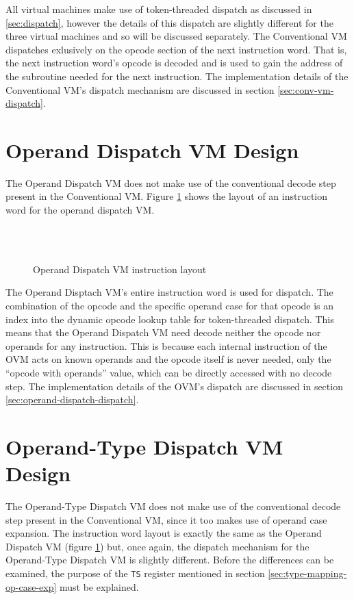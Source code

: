 \documentclass[english,a4paper,12pt]{report}
\begin{document}
All virtual machines make use of token-threaded dispatch as discussed
in \ref{sec:dispatch}, however the details of this dispatch are
slightly different for the three virtual machines and so will be
discussed separately. The Conventional VM dispatches exlusively on the
opcode section of the next instruction word. That is, the next
instruction word's opcode is decoded and is used to gain the address
of the subroutine needed for the next instruction. The implementation
details of the Conventional VM's dispatch mechanism are discussed in
section \ref{sec:conv-vm-dispatch}.


\section{Operand Dispatch VM Design}
The Operand Dispatch VM does not make use of the conventional decode
step present in the Conventional VM. Figure
\ref{fig:op-dispatch-instruction} shows the layout of an instruction
word for the operand dispatch VM.

\begin{figure}[!htb]
  \centering
	\begin{bytefield}[bitwidth=1.5em,endianness=big]{16}
	 \\
     \\
  \end{bytefield}
  \caption{Operand Dispatch VM instruction layout}
  \label{fig:op-dispatch-instruction}
\end{figure}

The Operand Disptach VM's entire instruction word is used for
dispatch. The combination of the opcode and the specific operand case
for that opcode is an index into the dynamic opcode lookup table for
token-threaded dispatch. This means that the Operand Dispatch VM need
decode neither the opcode nor operands for any instruction. This is
because each internal instruction of the OVM acts on known operands
and the opcode itself is never needed, only the ``opcode with
operands'' value, which can be directly accessed with no decode
step. The implementation details of the OVM's dispatch are discussed
in section \ref{sec:operand-dispatch-dispatch}.

\section{Operand-Type Dispatch VM Design}
\label{op-type-design}

The Operand-Type Dispatch VM does not make use of the conventional
decode step present in the Conventional VM, since it too makes use of
operand case expansion. The instruction word layout is exactly the
same as the Operand Dispatch VM (figure
\ref{fig:op-dispatch-instruction}) but, once again, the dispatch
mechanism for the Operand-Type Dispatch VM is slightly
different. Before the differences can be examined, the purpose of the
\verb|TS| register mentioned in section
\ref{sec:type-mapping-op-case-exp} must be explained.
\end{document}
